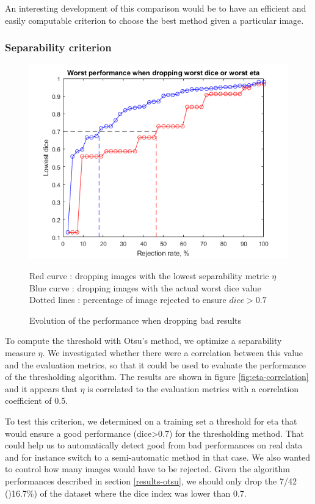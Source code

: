 \documentclass[a4paper,10pt]{article}
\begin{document}
An interesting development of this comparison would be to have an efficient and easily computable criterion to choose the best method given a particular image. 

\subsubsection{Separability criterion}

\begin{figure}[h]
	\centering
	\includegraphics[width=0.6\linewidth]{../results/selection-criterion/eta-dice-drop}
	\caption{Evolution of the performance when dropping bad results}{Red curve :  dropping images with the lowest separability metric $\eta$\\ Blue curve : dropping images with the actual worst dice value \\ Dotted lines : percentage of image rejected to ensure $dice > 0.7$}
	\label{fig:eta-dice-drop}
\end{figure}

To compute the threshold with Otsu's method, we optimize a separability measure $\eta$. We investigated whether there were a correlation between this value and the evaluation metrics, so that it could be used to evaluate the performance of the thresholding algorithm. The results are shown in figure \ref{fig:eta-correlation} and it appears that $\eta$ is correlated to the evaluation metrics with a correlation coefficient of 0.5.

To test this criterion, we determined on a training set a threshold for eta that would ensure a good performance (dice>0.7) for the thresholding method. That could help us to automatically detect good from bad performances on real data and for instance switch to a semi-automatic method in that case. We also wanted to control how many images would have to be rejected. Given the algorithm performances described in section \ref{results-otsu}, we should only drop the 7/42 ()16.7\%) of the dataset where the dice index was lower than 0.7.  
\end{document}

